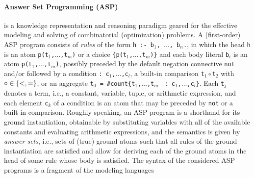 \documentclass{tlp} %
\begin{document}
\paragraph{Answer Set Programming (ASP)} \citep{lifschitz19a}
is a knowledge representation and reasoning paradigm geared for the effective 
modeling and solving of combinatorial (optimization) problems. %
A (first-order) ASP program consists of \emph{rules} of the form
\lstinline{h :- b}$_1$\lstinline{, }$\dots$\lstinline{, b}$_n$\lstinline{.},
in which the head \lstinline{h} is an atom
\lstinline{p(t}$_1$\lstinline{,}$\dots$\lstinline{,t}$_m$\lstinline{)} or a
choice
\lstinline{{p(t}$_1$\lstinline{,}$\dots$\lstinline{,t}$_m$\lstinline|)}|
and each body literal \lstinline{b}$_i$ is an atom
\lstinline{p(t}$_1$\lstinline{,}$\dots$\lstinline{,t}$_m$\lstinline{)},
possibly preceded by the default negation connective \lstinline{not} and/or
followed by a condition
\lstinline|: c|$_1$\lstinline{,}$\dots$\lstinline{,c}$_l$, 
a built-in comparison \lstinline{t}$_1\circ{}$\lstinline{t}$_2$
with $\circ\in\{\text{\lstinline{<}},\text{\lstinline{=}}\}$,
or an aggregate
\lstinline|t|$_0$\lstinline| = #count{t|$_1$\lstinline{,}$\dots$\lstinline{,t}$_m$%
\lstinline| : c|$_1$\lstinline{,}$\dots$\lstinline{,c}$_l$\lstinline|}|.
Each \lstinline|t|$_j$ denotes a term, i.e., a constant, variable, tuple,
or arithmetic expression, and each element \lstinline|c|$_k$ of a condition is
an atom that may be preceded by \lstinline{not} or a built-in comparison.
Roughly speaking, an ASP program is a shorthand for its ground instantiation,
obtainable by substituting variables with all of the available constants
and evaluating arithmetic expressions,
and the semantics is given by \emph{answer sets}, i.e.,
sets of (true) ground atoms such that all rules of the ground instantiation
are satisfied and allow for deriving each of the ground atoms in the head of
some rule whose body is satisfied.
The syntax of the considered ASP programs is a fragment of the modeling languages
\end{document}
